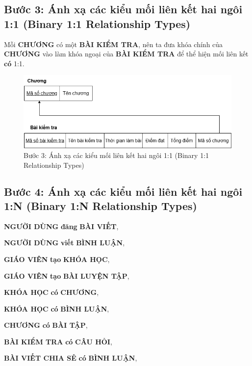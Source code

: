 \subsection{Bước 3: Ánh xạ các kiểu mối liên kết hai ngôi 1:1 (Binary	1:1	Relationship Types)}
Mỗi \textbf{CHƯƠNG} có một \textbf{BÀI KIỂM TRA}, nên ta đưa khóa chính của \textbf{CHƯƠNG} vào làm  khóa ngoại của \textbf{BÀI KIỂM TRA} để thể hiện mối liên kết \textbf{có} 1:1. \vspace{-12pt}
\begin{figure}[H]
    \centering
    \includegraphics[width=0.75\linewidth]{picture/lk1-1.png}
    \caption{Bước 3: Ánh xạ các kiểu mối liên kết hai ngôi 1:1 (Binary	1:1	Relationship Types)}
    \label{fig:placeholder}
\end{figure}
\subsection{Bước 4: Ánh xạ các kiểu mối liên kết hai ngôi 1:N (Binary	1:N	Relationship Types)}
\textbf{NGƯỜI DÙNG} \textbf{đăng} \textbf{BÀI VIẾT},

\textbf{NGƯỜI DÙNG} \textbf{viết} \textbf{BÌNH LUẬN},

\textbf{GIÁO VIÊN} \textbf{tạo} \textbf{KHÓA HỌC},

\textbf{GIÁO VIÊN} \textbf{tạo} \textbf{BÀI LUYỆN TẬP},

\textbf{KHÓA HỌC} \textbf{có} \textbf{CHƯƠNG}, 

\textbf{KHÓA HỌC} \textbf{có} \textbf{BÌNH LUẬN},

\textbf{CHƯƠNG} \textbf{có} \textbf{BÀI TẬP},

\textbf{BÀI KIỂM TRA} \textbf{có} \textbf{CÂU HỎI},

\textbf{BÀI VIẾT CHIA SẺ} \textbf{có} \textbf{BÌNH LUẬN},

